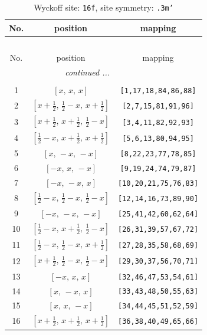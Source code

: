 \documentclass[fleqn,8pt]{jsarticle}
\begin{document}
\begin{longtable}{ccc}
\caption{Wyckoff site: {\tt 16f}, site symmetry: {\tt .3m'}}
 \\
 \hline \hline
No. & position & mapping \\ \hline \endfirsthead

\multicolumn{2}{l}{\tablename\ \thetable{}} \\
 \hline \hline
No. & position & mapping \\ \hline \endhead

 \hline \hline
\multicolumn{2}{r}{\footnotesize\it continued ...} \\ \endfoot

 \hline \hline
\multicolumn{2}{r}{} \\ \endlastfoot

1 & $\left[ x,\, x,\, x \right]$ & {\tt [1,17,18,84,86,88]} \\ \hline
2 & $\left[ x + \frac{1}{2},\, \frac{1}{2} - x,\, x + \frac{1}{2} \right]$ & {\tt [2,7,15,81,91,96]} \\ \hline
3 & $\left[ x + \frac{1}{2},\, x + \frac{1}{2},\, \frac{1}{2} - x \right]$ & {\tt [3,4,11,82,92,93]} \\ \hline
4 & $\left[ \frac{1}{2} - x,\, x + \frac{1}{2},\, x + \frac{1}{2} \right]$ & {\tt [5,6,13,80,94,95]} \\ \hline
5 & $\left[ x,\, - x,\, - x \right]$ & {\tt [8,22,23,77,78,85]} \\ \hline
6 & $\left[ - x,\, x,\, - x \right]$ & {\tt [9,19,24,74,79,87]} \\ \hline
7 & $\left[ - x,\, - x,\, x \right]$ & {\tt [10,20,21,75,76,83]} \\ \hline
8 & $\left[ \frac{1}{2} - x,\, \frac{1}{2} - x,\, \frac{1}{2} - x \right]$ & {\tt [12,14,16,73,89,90]} \\ \hline
9 & $\left[ - x,\, - x,\, - x \right]$ & {\tt [25,41,42,60,62,64]} \\ \hline
10 & $\left[ \frac{1}{2} - x,\, x + \frac{1}{2},\, \frac{1}{2} - x \right]$ & {\tt [26,31,39,57,67,72]} \\ \hline
11 & $\left[ \frac{1}{2} - x,\, \frac{1}{2} - x,\, x + \frac{1}{2} \right]$ & {\tt [27,28,35,58,68,69]} \\ \hline
12 & $\left[ x + \frac{1}{2},\, \frac{1}{2} - x,\, \frac{1}{2} - x \right]$ & {\tt [29,30,37,56,70,71]} \\ \hline
13 & $\left[ - x,\, x,\, x \right]$ & {\tt [32,46,47,53,54,61]} \\ \hline
14 & $\left[ x,\, - x,\, x \right]$ & {\tt [33,43,48,50,55,63]} \\ \hline
15 & $\left[ x,\, x,\, - x \right]$ & {\tt [34,44,45,51,52,59]} \\ \hline
16 & $\left[ x + \frac{1}{2},\, x + \frac{1}{2},\, x + \frac{1}{2} \right]$ & {\tt [36,38,40,49,65,66]} \\
\end{longtable}
\end{document}
